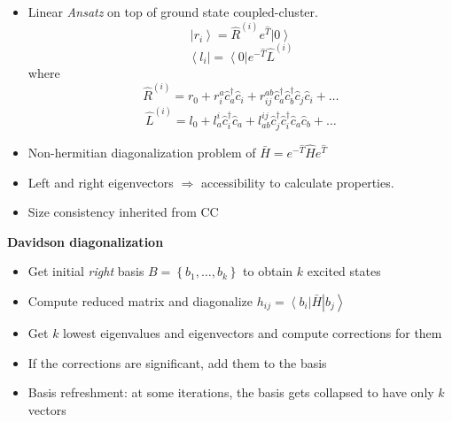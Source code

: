 \begin{itemize}
  \item
    Linear \textit{Ansatz} on top of ground state coupled-cluster.
      $$
      \left | r_i \right \rangle =
      \hat{R} ^{(i)} e^{\hat{T}} \left | 0  \right \rangle
      $$
      $$
      \left \langle l_i \right | =
      \left \langle 0 \right | e^{-\hat{T}} \hat{L}^{(i)}
      $$
    where
      $$
        \hat{R} ^{(i)} = r _{0}
                       + r ^{a} _{i} \hat{c} ^{\dagger} _{a} \hat{c} _{i}
                       + r ^{ab} _{ij} \hat{c} ^{\dagger} _{a} \hat{c} ^{\dagger} _{b}
                              \hat{c} _{j} \hat{c} _{i}
                       + \ldots
      $$
      $$
        \hat{L} ^{(i)} = l _{0}
                       + l ^{i} _{a} \hat{c} _{i}^{\dagger} \hat{c} _{a}
                       + l ^{ij} _{ab}
                          \hat{c} _{j} ^{\dagger} \hat{c} _{i}^{\dagger}
                          \hat{c} _{a} \hat{c} _{b}
                       + \ldots
      $$

  \item
    Non-hermitian diagonalization problem of
      $ \bar{H} = e^{-\hat{T}} \hat{H} e^{\hat{T}}$

  \item
    Left and right eigenvectors $ \Rightarrow $ accessibility to calculate
    properties.

  \item
    Size consistency inherited from CC

\end{itemize}

\textbf{Davidson diagonalization}
\begin{itemize}

  \item
    Get initial \textit{right} basis
    $ B = \left \{ b_{1}, \ldots, b_{k} \right \} $
    to obtain $ k $ excited states

  \item
    Compute reduced matrix and diagonalize
    $
      h_{ij} =
      \left \langle b_{i} \right | \bar H \left | b_{j} \right \rangle
    $

  \item
    Get $ k $ lowest eigenvalues and eigenvectors and compute corrections
    for them

  \item
    If the corrections are significant, add them to the basis

  \item
    Basis refreshment: at some iterations, the basis gets collapsed
    to have only $ k $ vectors

\end{itemize}
